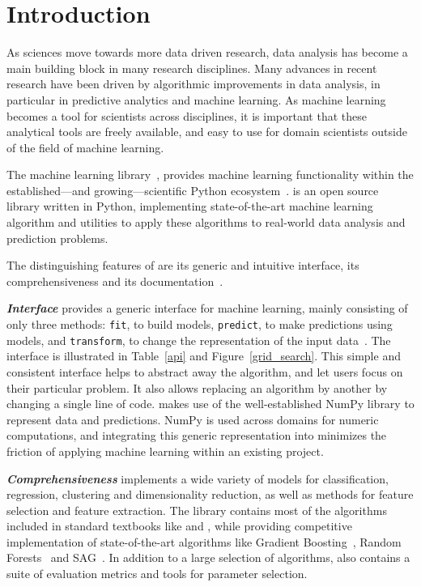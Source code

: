 \setcounter{section}{0}
\section{Introduction}
As sciences move towards more data driven research, data analysis has
become a main building block in many research disciplines.
Many advances in recent research have been driven by algorithmic improvements
in data analysis, in particular in predictive analytics and machine learning.
As machine learning becomes a tool for scientists across disciplines, it is
important that these analytical tools are freely available, and easy to use for
domain scientists outside of the field of machine learning.


The \sklearn{} machine learning library~\autocite{pedregosa2011scikit},
provides machine learning functionality within the established---and
growing---scientific Python ecosystem~\autocite{benlorica, infoworld}.
\sklearn{} is an open source library written in Python, implementing
state-of-the-art machine
learning algorithm and utilities to apply these algorithms to real-world data
analysis and prediction problems.

The distinguishing features of \sklearn{} are its generic and intuitive
interface, its comprehensiveness and its
documentation~\autocite{Varoquaux_2015, benlorica}.

\emph{\textbf{Interface}} \sklearn{} provides a generic interface for machine
learning, mainly consisting of only three methods: \texttt{fit}, to build
models, \texttt{predict}, to make predictions using models, and
\texttt{transform}, to change the representation of the input
data~\autocite{buitinck2013api}.  The interface is illustrated in
Table~\ref{api} and Figure~\ref{grid_search}.  This simple and consistent
interface helps to abstract away the algorithm, and let users focus on their
particular problem. It also allows replacing an algorithm by another by
changing a single line of code. \sklearn{} makes use of the well-established
NumPy library to represent data and predictions.  NumPy is used across domains
for numeric computations, and integrating this generic representation into
\sklearn{} minimizes the friction of applying machine learning within an
existing project.

\emph{\textbf{Comprehensiveness}} \sklearn{} implements a wide variety of
models for classification, regression, clustering and dimensionality reduction,
as well as methods for feature selection and feature extraction. The library
contains most of the algorithms included in standard textbooks like
\textcite{bishop2001bishop} and \textcite{friedman2001elements}, while
providing competitive implementation of state-of-the-art algorithms like
Gradient Boosting~\autocite{friedman2001greedy}, Random
Forests~\autocite{breiman2001random} and SAG~\autocite{roux2012stochastic}.  In
addition to a large selection of algorithms, \sklearn{} also contains a suite
of evaluation metrics and tools for parameter selection.

